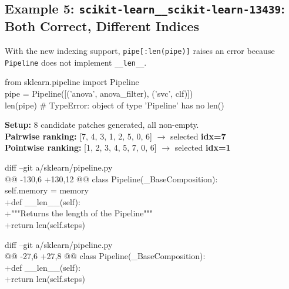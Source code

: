 \subsection{Example 5: \texttt{scikit-learn\_\_scikit-learn-13439}: Both Correct, Different Indices}

\begin{tcolorbox}[
    colback=promptbg,
    colframe=promptborder,
    title={\textbf{Issue: Pipeline should implement \_\_len\_\_}},
    coltitle=white,
    fonttitle=\small\bfseries,
    breakable,
    enhanced
]
\small
With the new indexing support, \texttt{pipe[:len(pipe)]} raises an error because \texttt{Pipeline} does not implement \texttt{\_\_len\_\_}.

\ttfamily
from sklearn.pipeline import Pipeline\\
pipe = Pipeline([('anova', anova\_filter), ('svc', clf)])\\
len(pipe)  \# TypeError: object of type 'Pipeline' has no len()
\end{tcolorbox}

\noindent\textbf{Setup:} 8 candidate patches generated, all non-empty.\\
\textbf{Pairwise ranking:} [7, 4, 3, 1, 2, 5, 0, 6] \quad $\rightarrow$ selected \textbf{idx=7} \checkmark\\
\textbf{Pointwise ranking:} [1, 2, 3, 4, 5, 7, 0, 6] \quad $\rightarrow$ selected \textbf{idx=1} \checkmark

\begin{tcolorbox}[
    colback=green!5,
    colframe=green!60!black,
    title={\textbf{Pairwise-Selected Patch (idx=7): Resolves the issue \checkmark}},
    coltitle=white,
    fonttitle=\small\bfseries,
    breakable,
    enhanced
]
\small\ttfamily
diff --git a/sklearn/pipeline.py\\
@@ -130,6 +130,12 @@ class Pipeline(\_BaseComposition):\\
\quad\quad self.memory = memory\\
+\quad def \_\_len\_\_(self):\\
+\quad\quad """Returns the length of the Pipeline"""\\
+\quad\quad return len(self.steps)
\end{tcolorbox}

\begin{tcolorbox}[
    colback=green!5,
    colframe=green!60!black,
    title={\textbf{Pointwise-Selected Patch (idx=1): Also resolves the issue \checkmark}},
    coltitle=white,
    fonttitle=\small\bfseries,
    breakable,
    enhanced
]
\small\ttfamily
diff --git a/sklearn/pipeline.py\\
@@ -27,6 +27,8 @@ class Pipeline(\_BaseComposition):\\
+\quad def \_\_len\_\_(self):\\
+\quad\quad return len(self.steps)
\end{tcolorbox}

